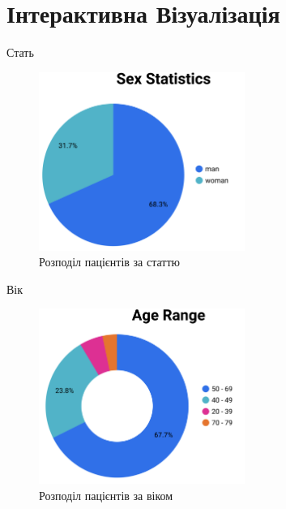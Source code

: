\documentclass{beamer}
\begin{document}
    \section{Інтерактивна Візуалізація}

    \begin{frame}{Стать}
        \begin{figure}
            \centering
            \includegraphics[width=0.6\textwidth]{images/sex.png}
            \caption{Розподіл пацієнтів за статтю}
        \end{figure}
    \end{frame}

    \begin{frame}{Вік}
        \begin{figure}
            \centering
            \includegraphics[width=0.6\textwidth]{images/age.png}
            \caption{Розподіл пацієнтів за віком}
        \end{figure}
    \end{frame}
\end{document}
